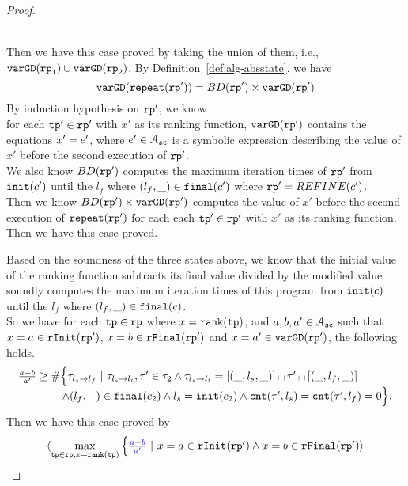 \begin{proof}
\begin{itemize}
\\
Then we have this case proved by taking the union of them, i.e., $\mathtt{varGD}(\mathtt{rp}_1) \cup \mathtt{varGD}(\mathtt{rp}_2)$.
 By Definition~\ref{def:alg-absstate}, we have
\[
  \mathtt{varGD}(\mathtt{repeat}(\mathtt{rp}')) =  BD(\mathtt{rp}')  \times
  {\ensuremath{\mathtt{varGD}}(\ensuremath{\mathtt{rp}}')}
\]
By induction hypothesis on $\mathtt{rp}'$, we know
\\
for each $\mathtt{tp}' \in \mathtt{rp}'$ with $x'$ as its ranking function,
$\mathtt{varGD}(\mathtt{rp}')$ contains the equations $x' = e'$, where $e' \in \mathcal{A}_{\mathtt{sc}}$ is a
symbolic expression describing the value of $x'$ before the second execution of $\mathtt{rp}'$.
\\
We also know $BD(\mathtt{rp}')$ computes the maximum iteration times of $\mathtt{rp}'$ from $\mathtt{init}(c')$ until the $l_f$ where $(l_f, \_) \in \mathtt{final}(c')$ where $\mathtt{rp}' = REFINE(c')$.
\\
Then we know $BD(\mathtt{rp}')  \times
{\ensuremath{\mathtt{varGD}}(\ensuremath{\mathtt{rp}}')}$
computes the value of $x'$ before the second execution of $\mathtt{repeat}(\mathtt{rp}')$ for each each $\mathtt{tp}' \in \mathtt{rp}'$ with $x'$ as its ranking function.
\\
Then we have this case proved.
\end{itemize}
Based on the soundness of the three states above, we know that the initial value of the ranking function
subtracts its final value divided by the modified value soundly computes the maximum iteration times of this program from $\mathtt{init}(c)$ until the $l_f$ where $(l_f, \_) \in \mathtt{final}(c)$.
\\
So we have for each $\mathtt{tp} \in \mathtt{rp}$ where $x = \mathtt{rank}(\mathtt{tp})$,
and $a, b, a ' \in \mathcal{A}_{\mathtt{sc}}$
such that $x = a \in \mathtt{rInit}(\mathtt{rp}')$, $x = b \in \mathtt{rFinal}(\mathtt{rp}')$ and $x = a' \in \mathtt{varGD}(\mathtt{rp}')$,
the following holds.
\[
  \begin{array}{l}
  \frac{a - b}{a'} \geq
    \# \Big\{\mathtt{\tau}_{l_s \to l_f} ~\vert~ \mathtt{\tau}_{l_s \to l_t}, \mathtt{\tau}' \in \mathtt{\tau}_2 \land \mathtt{\tau}_{l_s \to l_t} = [(\_, l_s, \_)] {\scriptscriptstyle ++} \mathtt{\tau}' {\scriptscriptstyle ++} [(\_, l_f, \_)]
    \\ \qquad \qquad
    \land (l_{f}, \_) \in \mathtt{final}(c_2)
    \land l_s = \mathtt{init}(c_2)
    \land \mathtt{cnt}(\mathtt{\tau}', l_s) = \mathtt{cnt}(\mathtt{\tau}', l_f) = 0 
    \Big\}.
    \end{array}
\]
Then we have this case proved by
\[
  \begin{array}{l}
    \config{
      \max\limits_{\tpath \in \rprog, x = \locbound(\tpath)}
    \Big\{ \highlight{\frac{a - b}{a'}} ~\vert~ x = a \in \rfinit(\rprog')
    \land x = b \in \rffinal(\rprog') 
}
\end{array}\]
\end{proof}
